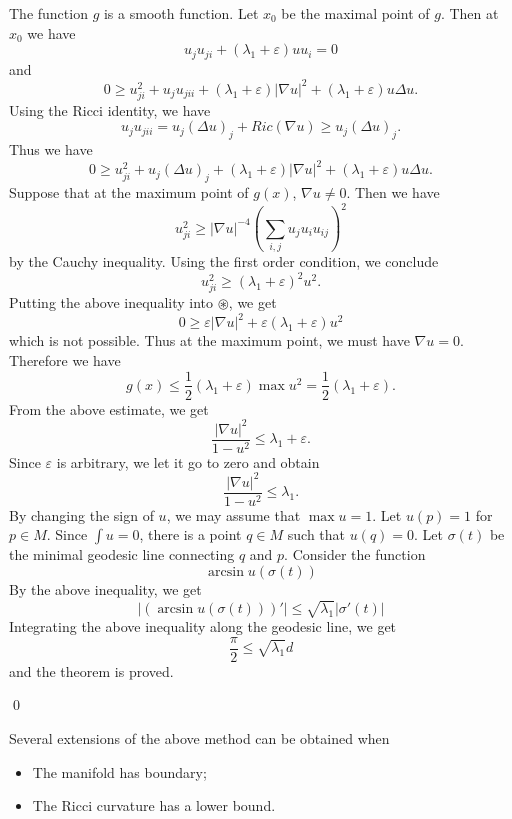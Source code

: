 The function $g$ is a smooth function. Let $x_0$ be the maximal point of $g$. 
Then at $x_0$ we have
\begin{equation}\label{1-1}
u_j u_{ji} + (\lambda_1 + \varepsilon) u u_i = 0
\end{equation}
and
\[
0 \geqslant u_{ji}^2 + u_j u_{jii} + (\lambda_1 + \varepsilon)
|\nabla u|^2 + (\lambda_1 + \varepsilon)u\Delta u.
\]
Using the Ricci identity, we have
\[
u_j u_{jii} = u_j(\Delta u)_j + Ric(\nabla u) \geqslant u_j(\Delta u)_j.
\]
Thus we have
\begin{equation}\label{2-1}
0 \geqslant u_{ji}^2 + u_j(\Delta u)_j + (\lambda_1 + \varepsilon)
|\nabla u|^2 + (\lambda_1 + \varepsilon)u\Delta u.
\end{equation}
Suppose that  at the maximum point of $g(x)$, $\nabla u \neq 0$. Then we have
\[
u_{ji}^2 \geqslant |\nabla u|^{-4}(\sum_{i,j}u_j u_i u_{ij})^2
\]
by the Cauchy inequality. Using the first order condition, we conclude
\[
u_{ji}^2 \geqslant (\lambda_1 + \varepsilon)^2 u^2.
\]
Putting the above inequality into $\circledast$, we get
\[
0 \geqslant \varepsilon|\nabla u|^2 + \varepsilon(\lambda_1 + \varepsilon)u^2
\]
which is not possible. Thus at the maximum point, we must have $\nabla u = 0$.
Therefore we have
\[
g(x) \leqslant \frac{1}{2}(\lambda_1 + \varepsilon)\max u^2 = \frac{1}{2}
(\lambda_1 + \varepsilon).
\]
From the above estimate, we get
\[
\frac{|\nabla u|^2}{1-u^2} \leqslant \lambda_1 + \varepsilon.
\]
Since $\varepsilon$ is arbitrary, we let it go to zero and obtain
\[
\frac{|\nabla u|^2}{1 - u^2} \leqslant \lambda_1.
\]
By changing the sign of $u$, we may assume that $\max u = 1$. Let $u(p) = 1$ for
$p\in M$. Since $\int u = 0$, there is a point $q\in M$ such that $u(q)=0$. Let
$\sigma(t)$ be the minimal geodesic line connecting $q$ and $p$. Consider the
function
\[
\arcsin u(\sigma(t))
\]
By the above inequality, we get
\[
|(\arcsin u(\sigma(t)))'| \leqslant \sqrt{\lambda_1}|\sigma '(t)|
\]
Integrating the above inequality along the geodesic line, we get
\[
\frac{\pi}{2} \leqslant \sqrt{\lambda_1}d
\]
and the theorem is proved.


\qed

Several extensions of the above method can be obtained when
\begin{itemize}
\item[\ding{172}] The manifold has boundary;
\item[\ding{173}] The Ricci curvature has a lower bound.
\end{itemize}

